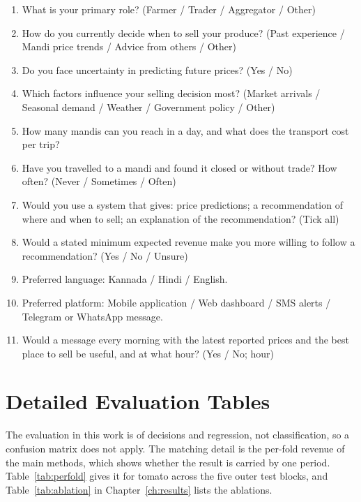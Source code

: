 \begin{enumerate}
    \item What is your primary role? (Farmer / Trader / Aggregator / Other)
    \item How do you currently decide when to sell your produce? (Past experience / Mandi price trends / Advice from others / Other)
    \item Do you face uncertainty in predicting future prices? (Yes / No)
    \item Which factors influence your selling decision most? (Market arrivals / Seasonal demand / Weather / Government policy / Other)
    \item How many mandis can you reach in a day, and what does the transport cost per trip?
    \item Have you travelled to a mandi and found it closed or without trade? How often? (Never / Sometimes / Often)
    \item Would you use a system that gives: price predictions; a recommendation of where and when to sell; an explanation of the recommendation? (Tick all)
    \item Would a stated minimum expected revenue make you more willing to follow a recommendation? (Yes / No / Unsure)
    \item Preferred language: Kannada / Hindi / English.
    \item Preferred platform: Mobile application / Web dashboard / SMS alerts / Telegram or WhatsApp message.
    \item Would a message every morning with the latest reported prices and the best place to sell be useful, and at what hour? (Yes / No; hour)
\end{enumerate}

\chapter{Detailed Evaluation Tables}
\label{appendix:metrics}

The evaluation in this work is of decisions and regression, not classification, so a confusion matrix does not apply. The matching detail is the per-fold revenue of the main methods, which shows whether the result is carried by one period. Table~\ref{tab:perfold} gives it for tomato across the five outer test blocks, and Table~\ref{tab:ablation} in Chapter~\ref{ch:results} lists the ablations.

\begin{table}[!t]
\centering
\caption{Mean realised revenue (Rs per quintal) by outer fold, tomato}
\label{tab:perfold}
\end{table}

